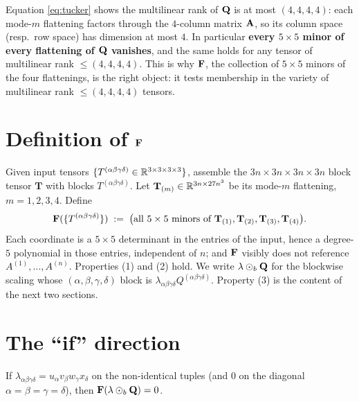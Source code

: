 \documentclass[11pt]{article}
\begin{document}
\noindent Equation \eqref{eq:tucker} shows the multilinear rank of $\mathbf{Q}$ is at
most $(4,4,4,4)$: each mode-$m$ flattening factors through the $4$-column matrix
$\mathbf{A}$, so its column space (resp.\ row space) has dimension at most $4$. In
particular \textbf{every $5\times5$ minor of every flattening of $\mathbf{Q}$ vanishes},
and the same holds for any tensor of multilinear rank $\le(4,4,4,4)$. This is
why $\mathbf{F}$, the collection of $5\times5$ minors of the four flattenings, is the
right object: it tests membership in the variety of multilinear rank
$\le(4,4,4,4)$ tensors.

\section*{Definition of \texorpdfstring{$\mathbf{F}$}{F}}

Given input tensors $\{T^{(\alpha\beta\gamma\delta)}\in\mathbb{R}^{3\times3\times3\times3}\}$,
assemble the $3n\times3n\times3n\times3n$ block tensor $\mathbf T$ with blocks
$T^{(\alpha\beta\gamma\delta)}$. Let $\mathbf T_{(m)}\in\mathbb{R}^{3n\times27n^{3}}$ be
its mode-$m$ flattening, $m=1,2,3,4$. Define
\[
  \mathbf{F}(\{T^{(\alpha\beta\gamma\delta)}\})
   \;:=\;\bigl(\text{all }5\times5\text{ minors of }\mathbf T_{(1)},\mathbf T_{(2)},\mathbf T_{(3)},\mathbf T_{(4)}\bigr).
\]
Each coordinate is a $5\times5$ determinant in the entries of the input, hence a
degree-$5$ polynomial in those entries, independent of $n$; and $\mathbf{F}$ visibly
does not reference $A^{(1)},\dots,A^{(n)}$. Properties (1) and (2) hold. We
write $\lambda\odot_b\mathbf{Q}$ for the blockwise scaling whose
$(\alpha,\beta,\gamma,\delta)$ block is $\lambda_{\alpha\beta\gamma\delta}Q^{(\alpha\beta\gamma\delta)}$.
Property (3) is the content of the next two sections.

\section*{The ``if'' direction}

\begin{qnineproposition}\label{prop:if}
If $\lambda_{\alpha\beta\gamma\delta}=u_\alpha v_\beta w_\gamma x_\delta$ on the
non-identical tuples (and $0$ on the diagonal $\alpha=\beta=\gamma=\delta$), then
$\mathbf{F}(\lambda\odot_b\mathbf{Q})=0$.
\end{qnineproposition}
\end{document}

